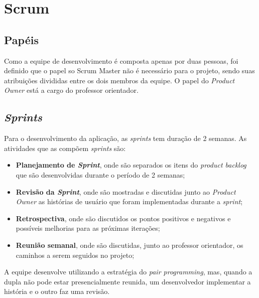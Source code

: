 \section{Scrum}

\subsection{Papéis}
Como a equipe de desenvolvimento é composta apenas por duas pessoas, foi definido que o papel so Scrum Master não é necessário para o projeto, sendo suas atribuições divididas entre os dois membros da equipe. O papel do \textit{Product Owner} está a cargo do professor orientador.

\subsection{\textit{Sprints}}
Para o desenvolvimento da aplicação, as \textit{sprints} tem duração de 2 semanas. As atividades que as compõem \textit{sprints} são: 
\begin{itemize}
  \item \textbf{Planejamento de \textit{Sprint}}, onde são separados os itens do \textit{product backlog} que são desenvolvidas durante o período de 2 semanas;
  \item \textbf{Revisão da \textit{Sprint}}, onde são mostradas e discutidas junto ao \textit{Product Owner} as histórias de usuário que foram implementadas durante a \textit{sprint};
  \item \textbf{Retrospectiva}, onde são discutidos os pontos positivos e negativos e possíveis melhorias para as próximas iterações;
  \item \textbf{Reunião semanal}, onde são discutidas, junto ao professor orientador, os caminhos a serem seguidos no projeto;
\end{itemize}
A equipe desenvolve utilizando a estratégia do \textit{pair programming}, mas, quando a dupla não pode estar presencialmente reunida, um desenvolvedor implementar a história e o outro faz uma revisão.
